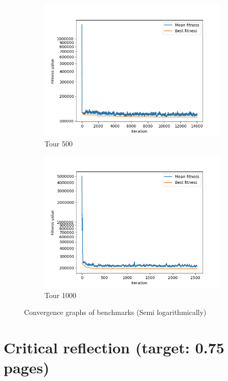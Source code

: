 \documentclass[a4paper,10pt]{article}
\begin{document}
\begin{figure}[H]
\begin{subfigure}[b]{0.40\linewidth}
          \includegraphics[width=\linewidth]{tour_500_28_12_2021_20_20.png}
      \caption{Tour 500}
      \label{fig:tour_500}
    \end{subfigure}
    \begin{subfigure}[b]{0.40\linewidth}
          \includegraphics[width=\linewidth]{tour_1000_28_12_2021_20_40.png}
      \caption{Tour 1000}
      \label{fig:tour_1000}
    \end{subfigure}
    \caption{Convergence graphs of benchmarks (Semi logarithmically)}
    \label{fig:convergence_graphs}
  \end{figure}

\section{Critical reflection (target: 0.75 pages)}
\end{document}

